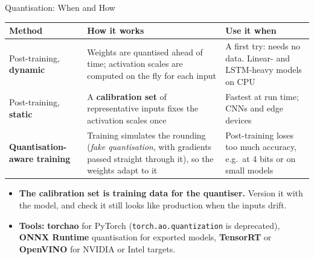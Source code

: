 \begin{frame}{Quantisation: When and How}

    \centering
    \renewcommand{\arraystretch}{1.3}
    {\scriptsize
    \begin{tabular}{p{3.0cm}|p{5.0cm}|p{3.6cm}}
        \toprule
        \textbf{Method} & \textbf{How it works} & \textbf{Use it when} \\
        \midrule
        Post-training, \textbf{dynamic}
            & Weights are quantised ahead of time; activation scales are computed on the fly for each input
            & A first try: needs no data. Linear- and LSTM-heavy models on CPU \\
        Post-training, \textbf{static}
            & A \textbf{calibration set} of representative inputs fixes the activation scales once
            & Fastest at run time; CNNs and edge devices \\
        \textbf{Quantisation-aware training}
            & Training simulates the rounding (\emph{fake quantisation}, with gradients passed straight
              through it), so the weights adapt to it
            & Post-training loses too much accuracy, e.g.\ at 4 bits or on small models \\
        \bottomrule
    \end{tabular}}

    \vspace{0.6em}
    \begin{itemize}
        \item \textbf{The calibration set is training data for the quantiser.} Version it with the model, and
              check it still looks like production when the inputs drift.
        \item \textbf{Tools:} \textbf{torchao} for PyTorch (\texttt{torch.ao.quantization} is deprecated),
              \textbf{ONNX Runtime} quantisation for exported models, \textbf{TensorRT} or
              \textbf{OpenVINO} for NVIDIA or Intel targets.
    \end{itemize}

\end{frame}

